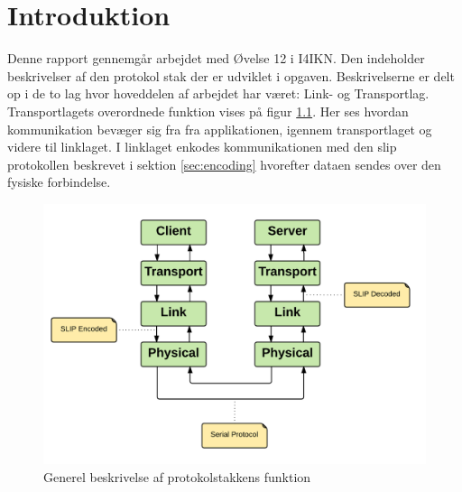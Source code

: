 \chapter{Introduktion}
Denne rapport gennemgår arbejdet med Øvelse 12 i I4IKN. Den indeholder beskrivelser af den protokol stak der er udviklet i opgaven. Beskrivelserne er delt op i de to lag hvor hoveddelen af arbejdet har været: Link- og Transportlag. \\

Transportlagets overordnede funktion vises på figur \ref{fig:protokolstak}. Her ses hvordan kommunikation bevæger sig fra fra applikationen, igennem transportlaget og videre til linklaget. I linklaget enkodes kommunikationen med den slip protokollen beskrevet i sektion \ref{sec:encoding} hvorefter dataen sendes over den fysiske forbindelse.

\begin{figure}[H]
	\centering
	\includegraphics[width=.9\textwidth]{ProtocolStack.png}
	\caption{Generel beskrivelse af protokolstakkens funktion}
	\label{fig:protokolstak}
\end{figure}